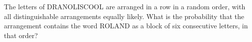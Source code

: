 The letters of DRANOLISCOOL are arranged in a row in a random order, with all distinguishable arrangements equally likely. What is the probability that the arrangement contains the word ROLAND as a block of six consecutive letters, in that order?
